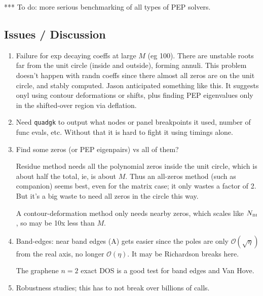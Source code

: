 \documentclass[11pt]{article}
\newcommand{\ben}{\begin{enumerate}}
\newcommand{\een}{\end{enumerate}}
\newcommand{\tbox}[1]{{\mbox{\tiny #1}}}
\newcommand{\bigO}{{\mathcal O}}
\begin{document}
*** To do: more serious benchmarking of all types of PEP solvers.

\subsection{Issues / Discussion}

\ben
\item Failure for exp decaying coeffs at large $M$ (eg 100).
  There are unstable roots far from the unit circle (inside and outside),
  forming annuli.
  This problem doesn't happen with randn coeffs since there almost all zeros
  are on the unit circle, and stably computed.
  Jason anticipated something like this.
  It suggests onyl using contour deformations or shifts, plus finding
  PEP eigenvalues only in the shifted-over region via deflation.
  
\item Need {\tt quadgk} to output what nodes or panel breakpoints it used,
  number of func evals, etc.
  Without that it is hard to fight it using timings alone.

\item Find some zeros (or PEP eigenpairs) vs all of them?
  
  Residue method needs all the polynomial zeros inside the unit circle,
  which is about half the total, ie, is about $M$.
  Thus an all-zeros method (such as companion) seems best, even for
  the matrix case; it only wastes a factor of 2.
  But it's a big waste to need all zeros in the circle this way.
  
  A contour-deformation method only needs nearby zeros, which scales
  like $N_\tbox{BI}$, so may be 10x less than $M$.

\item
  Band-edges: near band edges (A) gets easier since the poles are only
  $\bigO(\sqrt{\eta})$ from the real axis, no longer $\bigO(\eta)$.
  It may be Richardson breaks here.

  The graphene $n=2$ exact DOS is a good test for band edges and Van Hove.

\item Robustness studies; this has to not break over billions of calls.
\een





  




\end{document}

